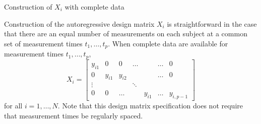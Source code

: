 \begin{example}{Construction of $X_i$ with complete data} \label{example:construction-of-X}

\vspace{.3cm} 

Construction of the autoregressive design matrix $X_i$ is straightforward in the case that there are an equal number of measurements on each subject at a common set of measurement times $t_1,\dots, t_p$. When complete data are available for measurement times $t_1, \dots, t_p$, 
\begin{equation}
X_i =  \begin{bmatrix} 
y_{i1} & 0 & 0 & \dots & &\dots & 0 \\
 0 & y_{i 1} &  y_{i2}& & & \dots & 0 \\
 \vdots &&&\ddots&&&\\
 0 & 0 & \dots & & y_{i1} & \dots &  y_{i,{p-1}}
\end{bmatrix}
\end{equation}
\noindent
for all $i = 1,\dots, N$. Note that this design matrix specification does not require that measurement times be regularly spaced.  
\end{example}

